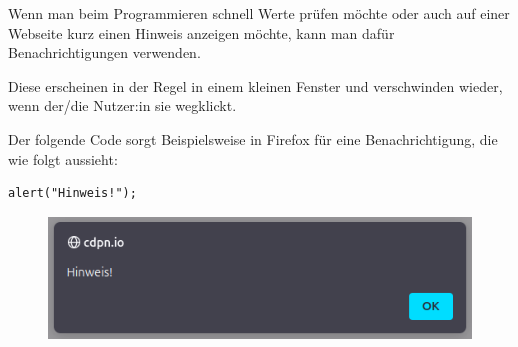 \documentclass[a4paper,14pt]{extarticle}
\begin{document}


Wenn man beim Programmieren schnell Werte prüfen möchte oder auch auf einer Webseite kurz einen Hinweis anzeigen möchte, kann man dafür Benachrichtigungen verwenden.

Diese erscheinen in der Regel in einem kleinen Fenster und verschwinden wieder, wenn der/die Nutzer:in sie wegklickt.

Der folgende Code sorgt Beispielsweise in Firefox für eine Benachrichtigung, die wie folgt aussieht:

\begin{verbatim}
alert("Hinweis!");
\end{verbatim}

\begin{figure}[h]
	\centering
	\includegraphics[width=\textwidth]{alert.png}
\end{figure}

\end{document}
